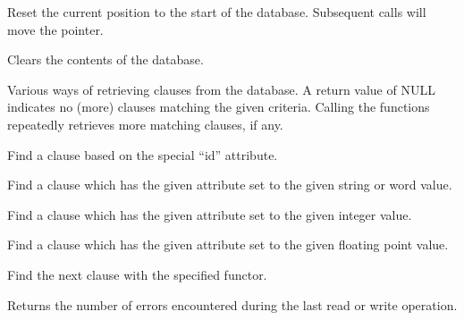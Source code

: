
Reset the current position to the start of the database. Subsequent
\rtfsp{} calls will move the pointer.

\label{wxexprdatabasecleardatabase}


Clears the contents of the database.

\label{wxexprdatabasefindclause}

Various ways of retrieving clauses from the database. A return
value of NULL indicates no (more) clauses matching the given criteria.
Calling the functions repeatedly retrieves more matching clauses, if any.


Find a clause based on the special ``id'' attribute.


Find a clause which has the given attribute set to the given string or word value.


Find a clause which has the given attribute set to the given integer value.


Find a clause which has the given attribute set to the given floating point value.

\label{wxexprdatabasefindclausebyfunctor}


Find the next clause with the specified functor.

\label{wxexprdatabasegeterrorcount}


Returns the number of errors encountered during the last read or write operation.

\label{wxexprdatabasehashfind}


